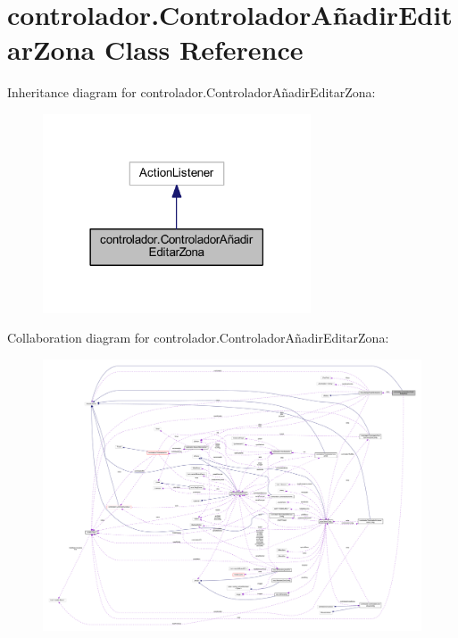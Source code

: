 \hypertarget{classcontrolador_1_1_controlador_a_xC3_xB1adir_editar_zona}{}\section{controlador.\+Controlador\+Añadir\+Editar\+Zona Class Reference}
\label{classcontrolador_1_1_controlador_a_xC3_xB1adir_editar_zona}


Inheritance diagram for controlador.\+Controlador\+Añadir\+Editar\+Zona\+:
\nopagebreak
\begin{figure}[H]
\begin{center}
\leavevmode
\includegraphics[width=225pt]{classcontrolador_1_1_controlador_a_xC3_xB1adir_editar_zona__inherit__graph}
\end{center}
\end{figure}


Collaboration diagram for controlador.\+Controlador\+Añadir\+Editar\+Zona\+:
\nopagebreak
\begin{figure}[H]
\begin{center}
\leavevmode
\includegraphics[width=350pt]{classcontrolador_1_1_controlador_a_xC3_xB1adir_editar_zona__coll__graph}
\end{center}
\end{figure}
